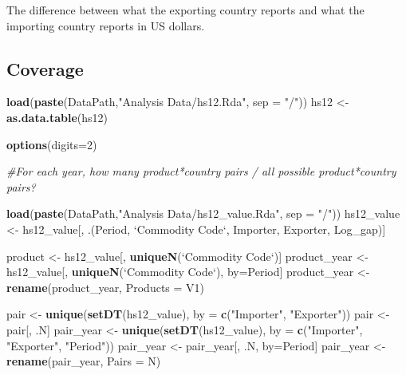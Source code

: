 \documentclass[10pt,]{article}
\newenvironment{Shaded}{\begin{snugshade}}{\end{snugshade}}
\newcommand{\KeywordTok}[1]{\textcolor[rgb]{0.13,0.29,0.53}{\textbf{{#1}}}}
\newcommand{\DataTypeTok}[1]{\textcolor[rgb]{0.13,0.29,0.53}{{#1}}}
\newcommand{\DecValTok}[1]{\textcolor[rgb]{0.00,0.00,0.81}{{#1}}}
\newcommand{\StringTok}[1]{\textcolor[rgb]{0.31,0.60,0.02}{{#1}}}
\newcommand{\CommentTok}[1]{\textcolor[rgb]{0.56,0.35,0.01}{\textit{{#1}}}}
\newcommand{\NormalTok}[1]{{#1}}
\begin{document}
The difference between what the exporting country reports and what the
importing country reports in US dollars.

\subsection{Coverage}\label{coverage}

\begin{Shaded}
\begin{Highlighting}[]
\KeywordTok{load}\NormalTok{(}\KeywordTok{paste}\NormalTok{(DataPath,}\StringTok{"Analysis Data/hs12.Rda"}\NormalTok{, }\DataTypeTok{sep =} \StringTok{"/"}\NormalTok{))}
\NormalTok{hs12 <-}\StringTok{ }\KeywordTok{as.data.table}\NormalTok{(hs12)}

\KeywordTok{options}\NormalTok{(}\DataTypeTok{digits=}\DecValTok{2}\NormalTok{)}

\CommentTok{#For each year, how many product*country pairs / all possible product*country pairs?}

\KeywordTok{load}\NormalTok{(}\KeywordTok{paste}\NormalTok{(DataPath,}\StringTok{"Analysis Data/hs12_value.Rda"}\NormalTok{, }\DataTypeTok{sep =} \StringTok{"/"}\NormalTok{))}
\NormalTok{hs12_value <-}\StringTok{ }\NormalTok{hs12_value[, .(Period, }\StringTok{`}\DataTypeTok{Commodity Code}\StringTok{`}\NormalTok{, Importer, Exporter, Log_gap)]}

\NormalTok{product <-}\StringTok{ }\NormalTok{hs12_value[, }\KeywordTok{uniqueN}\NormalTok{(}\StringTok{`}\DataTypeTok{Commodity Code}\StringTok{`}\NormalTok{)]}
\NormalTok{product_year <-}\StringTok{ }\NormalTok{hs12_value[, }\KeywordTok{uniqueN}\NormalTok{(}\StringTok{`}\DataTypeTok{Commodity Code}\StringTok{`}\NormalTok{), by=Period]}
\NormalTok{product_year <-}\StringTok{ }\KeywordTok{rename}\NormalTok{(product_year, }\DataTypeTok{Products =} \NormalTok{V1)}

\NormalTok{pair <-}\StringTok{ }\KeywordTok{unique}\NormalTok{(}\KeywordTok{setDT}\NormalTok{(hs12_value), }\DataTypeTok{by =} \KeywordTok{c}\NormalTok{(}\StringTok{"Importer"}\NormalTok{, }\StringTok{"Exporter"}\NormalTok{))}
\NormalTok{pair <-}\StringTok{ }\NormalTok{pair[, .N]}
\NormalTok{pair_year <-}\StringTok{ }\KeywordTok{unique}\NormalTok{(}\KeywordTok{setDT}\NormalTok{(hs12_value), }\DataTypeTok{by =} \KeywordTok{c}\NormalTok{(}\StringTok{"Importer"}\NormalTok{, }\StringTok{"Exporter"}\NormalTok{, }\StringTok{"Period"}\NormalTok{))}
\NormalTok{pair_year <-}\StringTok{ }\NormalTok{pair_year[, .N, by=Period]}
\NormalTok{pair_year <-}\StringTok{ }\KeywordTok{rename}\NormalTok{(pair_year, }\DataTypeTok{Pairs =} \NormalTok{N)}


\end{Highlighting}
\end{Shaded}
\end{document}
